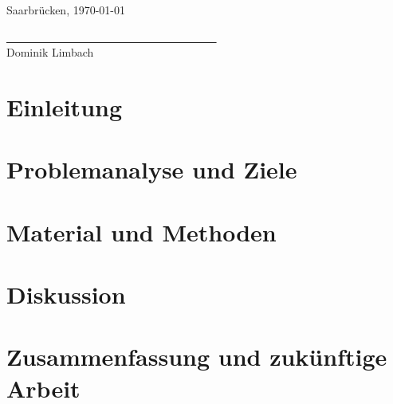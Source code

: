 \documentclass[
    12pt,
    a4paper,
	chapterprefix=false,
	parskip=full,
	headings=normal,
	numbers=noenddot
]{scrreprt}
\begin{document}
\vspace{1cm}

Saarbrücken, \today\\

\vspace{1.5cm}

\underline{~ ~ ~ ~ ~ ~ ~ ~ ~ ~ ~ ~ ~ ~ ~ ~ ~ ~ ~ ~ ~ ~ ~}\\
\small
Dominik Limbach
\normalsize

\newpage

\renewcommand{\contentsname}{Contents}
\hypersetup{linkcolor=black}
\tableofcontents
\hypersetup{linkcolor=darkblue}

\newpage


\chapter{Einleitung}




\chapter{Problemanalyse und Ziele}




\chapter{Material und Methoden}





%


\chapter{Diskussion}




\chapter{Zusammenfassung und zukünftige Arbeit}



\end{document}
